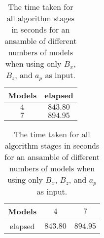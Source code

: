 \begin{table}[!ht]
	\centering
	\begin{tabular}{|c|c|}
		\hline
		Models & elapsed \\ \hline
		$4$ & $843.80$ \\ \hline
		$7$ & $894.95$ \\ \hline
	\end{tabular}
	\caption{The time taken for all algorithm stages in seconds for an ansamble of different numbers of models when using only $B_{x}$, $B_{z}$, and $a_{p}$ as input.}
	\label{tab:time:ansamble:xzap}
\end{table}

\begin{table}[!ht]
	\centering
	\begin{tabular}{|c|c|c|}
		\hline
		Models & $4$ & $7$ \\ \hline
		elapsed & $843.80$ & $894.95$ \\ \hline
	\end{tabular}
	\caption{The time taken for all algorithm stages in seconds for an ansamble of different numbers of models when using only $B_{x}$, $B_{z}$, and $a_{p}$ as input.}
	\label{tab:time:ansamble:reverse:xzap}
\end{table}
